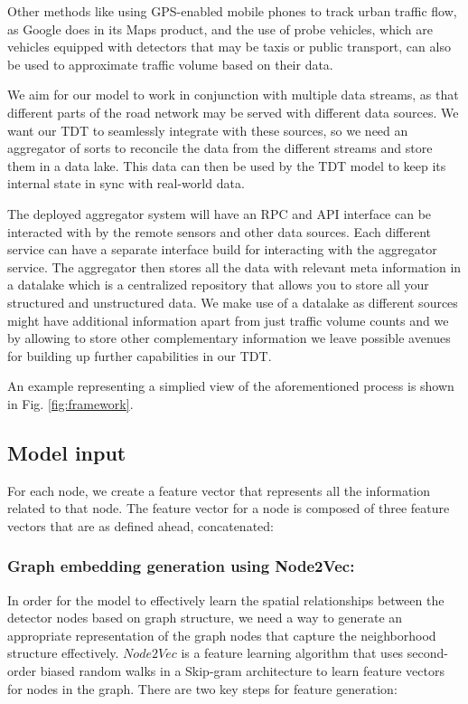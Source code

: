 \documentclass[conference]{IEEEtran}
\begin{document}
Other methods like using GPS-enabled mobile phones\cite{rose2006mobile} to track urban traffic flow, as Google does in its Maps product, and the use of probe vehicles\cite{zhu2012probe}, which are vehicles equipped with detectors that may be taxis or public transport, can also be used to approximate traffic volume based on their data.

We aim for our model to work in conjunction with multiple data streams, as that different parts of the road network may be served with different data sources. We want our TDT to seamlessly integrate with these sources, so we need an aggregator of sorts to reconcile the data from the different streams and store them in a data lake. This data can then be used by the TDT model to keep its internal state in sync with real-world data.

The deployed aggregator system will have an RPC and API interface can be interacted with by the remote sensors and other data sources. Each different service can have a separate interface build for interacting with the aggregator service. The aggregator then stores all the data with relevant meta information in a datalake which is a centralized repository that allows you to store all your structured and unstructured data. We make use of a datalake as different sources might have additional information apart from just traffic volume counts and we by allowing to store other complementary information we leave possible avenues for building up further capabilities in our TDT.

An example representing a simplied view of the aforementioned process is shown in Fig. \ref{fig:framework}.

\subsection{\textbf{Model input}}

For each node, we create a feature vector that represents all the information related to that node. The feature vector for a node is composed of three feature vectors that are as defined ahead, concatenated:

\subsubsection{Graph embedding generation using Node2Vec:}

In order for the model to effectively learn the spatial relationships between the detector nodes based on graph structure, we need a way to generate an appropriate representation of the graph nodes that capture the neighborhood structure effectively. $Node2Vec$\cite{node2vec} is a feature learning algorithm that uses second-order biased random walks in a Skip-gram architecture to learn feature vectors for nodes in the graph. There are two key steps for feature generation:
\end{document}
